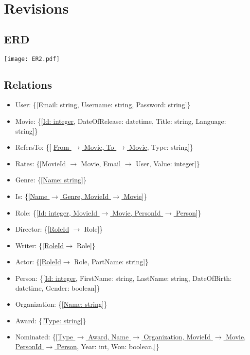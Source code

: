 \section{Revisions}

\subsection{ERD}
\texttt{[image: ER2.pdf]}

\subsection{Relations}
\begin{itemize}
\item User: \{[\underline{Email: string}, Username: string, Password: string]\}

\item Movie: \{[\underline{Id: integer}, DateOfRelease: datetime, Title: string, Language: string]\}

\item RefersTo: \{[ \underline{From $\rightarrow$ Movie, To $\rightarrow$ Movie}, Type: string]\}

\item Rates: \{[\underline{MovieId $\rightarrow$ Movie, Email $ \rightarrow $ User}, Value: integer]\}

\item Genre: \{[\underline{Name: string}]\}

\item Is: \{[\underline{Name $\rightarrow$ Genre, MovieId $\rightarrow$ Movie}]\}

\item Role: \{[\underline{Id: integer, MovieId $\rightarrow$ Movie, PersonId $ \rightarrow $ Person}]\}

\item Director: \{[\underline{RoleId} $ \rightarrow $ Role]\}

\item Writer: \{[\underline{RoleId}$ \rightarrow $ Role]\}

\item Actor: \{[\underline{RoleId}$ \rightarrow $ Role, PartName: string]\}

\item Person: \{[\underline{Id: integer}, FirstName: string, LastName: string, DateOfBirth: datetime, Gender: boolean]\}

\item Organization: \{[\underline{Name: string}]\}

\item Award: \{[\underline{Type: string}]\}

\item Nominated: \{[\underline{Type $ \rightarrow $ Award, Name $ \rightarrow $ Organization, MovieId $\rightarrow$ Movie,}\\
\underline{PersonId $ \rightarrow $ Person}, Year: int, Won: boolean,]\}
\end{itemize}

